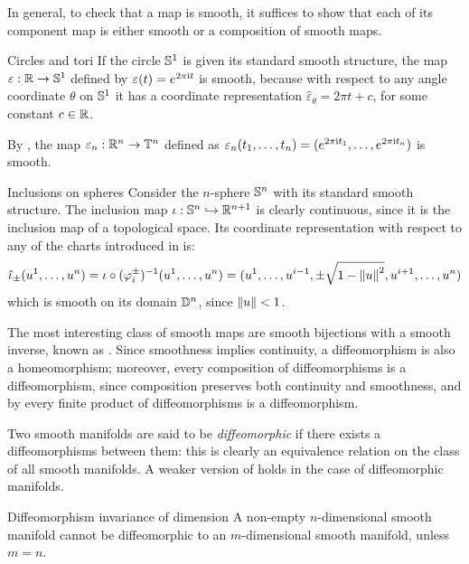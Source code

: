In general, to check that a map is smooth, it suffices to show that each of its component map is either smooth or a composition of smooth maps.

\begin{example}{Circles and tori}{}
  If the circle $ \mathbb{S}^{1} $ is given its standard smooth structure, the map $ \varepsilon : \mathbb{R} \rightarrow \mathbb{S}^{1} $ defined by $ \varepsilon(t) = e^{2\pi \mathrm{i} t} $ is smooth, because with respect to any angle coordinate $ \theta $ on $ \mathbb{S}^{1} $ it has a coordinate representation $ \hat{\varepsilon}_\theta = 2\pi t + c $, for some constant $ c \in \mathbb{R} $.

  By , the map $ \varepsilon_n : \mathbb{R}^n \rightarrow \mathbb{T}^{n} $ defined as $ \varepsilon_n(t_1 , \dots , t_n) = (e^{2\pi \mathrm{i} t_1} , \dots , e^{2\pi \mathrm{i} t_n}) $ is smooth.
\end{example}

\begin{example}{Inclusions on spheres}{}
  Consider the $ n $-sphere $ \mathbb{S}^{n} $ with its standard smooth structure. The inclusion map $ \iota : \mathbb{S}^{n} \hookrightarrow \mathbb{R}^{n+1} $ is clearly continuous, since it is the inclusion map of a topological space. Its coordinate representation with respect to any of the charts introduced in  is:
  \begin{equation*}
    \hat{\iota}_\pm(u^1 , \dots , u^n) = \iota \circ (\varphi_i^\pm)^{-1}(u^1 , \dots , u^n) = (u^1 , \dots , u^{i-1} , \pm \sqrt{1 - \left\lVert u\right\rVert^2} , u^{i+1} , \dots , u^n)
  \end{equation*}
  which is smooth on its domain $ \mathbb{D}^{n} $, since $ \left\lVert u\right\rVert < 1 $.
\end{example}

The most interesting class of smooth maps are smooth bijections with a smooth inverse, known as . Since smoothness implies continuity, a diffeomorphism is also a homeomorphism; moreover, every composition of diffeomorphisms is a diffeomorphism, since composition preserves both continuity and smoothness, and by  every finite product of diffeomorphisms is a diffeomorphism.

Two smooth manifolds are said to be \emph{diffeomorphic} if there exists a diffeomorphisms between them: this is clearly an equivalence relation on the class of all smooth manifolds. A weaker version of  holds in the case of diffeomorphic manifolds.

\begin{theorem}{Diffeomorphism invariance of dimension}{}
  A non-empty $ n $-dimensional smooth manifold cannot be diffeomorphic to an $ m $-dimensional smooth manifold, unless $ m = n $.
\end{theorem}


